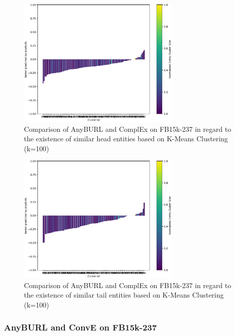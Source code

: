 \begin{figure}[H]
\centering
\includegraphics[width=0.7\textwidth]{images/head_cluster_100_anyburl_complex_fb15k.PNG}
\caption{Comparison of AnyBURL and ComplEx on FB15k-237 in regard to the existence of similar head entities based on K-Means Clustering (k=100)}
\label{fig:head_cluster_100_anyburl_complex_fb15k}
\end{figure}

\begin{figure}[H]
\centering
\includegraphics[width=0.7\textwidth]{images/tail_cluster_100_anyburl_complex_fb15k.PNG}
\caption{Comparison of AnyBURL and ComplEx on FB15k-237 in regard to the existence of similar tail entities based on K-Means Clustering (k=100)}
\label{fig:tail_cluster_100_anyburl_complex_fb15k}
\end{figure}

\subsubsection{AnyBURL and ConvE on FB15k-237}

